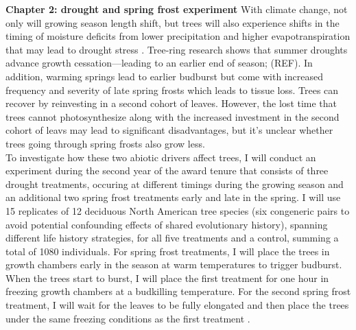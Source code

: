 \documentclass[12pt]{article}
\begin{document}
\textbf{Chapter 2: drought and spring frost experiment}
With climate change, not only will growing season length shift, but trees will also experience shifts in the timing of moisture deficits from lower precipitation and higher evapotranspiration that may lead to drought stress \cite{dox_wood_2022}. Tree-ring research shows that summer droughts advance growth cessation---leading to an earlier end of season\citep{kang_earlier_2023}; (REF). In addition, warming springs lead to earlier budburst but come with increased frequency and severity of late spring frosts which leads to tissue loss. Trees can recover by reinvesting in a second cohort of leaves. However, the lost time that trees cannot photosynthesize along with the increased investment in the second cohort of leavs may lead to significant disadvantages, but it's unclear whether trees going through spring frosts also grow less. \\
To investigate how these two abiotic drivers affect trees, I will conduct an experiment during the second year of the award tenure that consists of three drought treatments, occuring at different timings during the growing season and an additional two spring frost treatments early and late in the spring. I will use 15 replicates of 12 deciduous North American tree species (six congeneric pairs to avoid potential confounding effects of shared evolutionary history), spanning different life history strategies, for all five treatments and a control, summing a total of 1080 individuals. For spring frost treatments, I will place the trees in growth chambers early in the season at warm temperatures to trigger budburst. When the trees start to burst, I will place the first treatment for one hour in freezing growth chambers at a budkilling temperature. For the second spring frost treatment, I will wait for the leaves to be fully elongated and then place the trees under the same freezing conditions as the first treatment \citep{zohner_increased_2018}.\\
\end{document}
